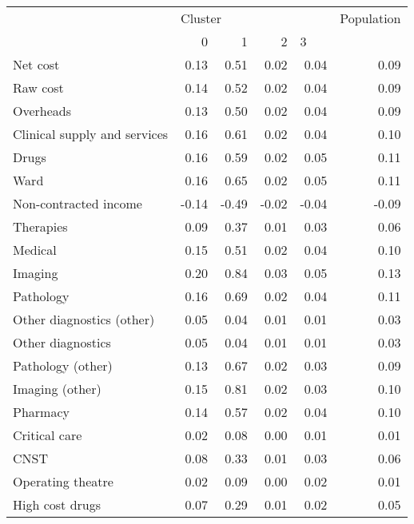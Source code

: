 \begin{tabular}{lrrrrr}
\toprule
{} & \multicolumn{4}{l}{Cluster} & Population \\
{} &       0 &     1 &     2 & \multicolumn{2}{l}{3} \\
\midrule
Net cost                       &    0.13 &  0.51 &  0.02 &  0.04 &       0.09 \\
Raw cost                       &    0.14 &  0.52 &  0.02 &  0.04 &       0.09 \\
Overheads                      &    0.13 &  0.50 &  0.02 &  0.04 &       0.09 \\
Clinical supply and services   &    0.16 &  0.61 &  0.02 &  0.04 &       0.10 \\
Drugs                          &    0.16 &  0.59 &  0.02 &  0.05 &       0.11 \\
Ward                           &    0.16 &  0.65 &  0.02 &  0.05 &       0.11 \\
Non-contracted income          &   -0.14 & -0.49 & -0.02 & -0.04 &      -0.09 \\
Therapies                      &    0.09 &  0.37 &  0.01 &  0.03 &       0.06 \\
Medical                        &    0.15 &  0.51 &  0.02 &  0.04 &       0.10 \\
Imaging                        &    0.20 &  0.84 &  0.03 &  0.05 &       0.13 \\
Pathology                      &    0.16 &  0.69 &  0.02 &  0.04 &       0.11 \\
Other diagnostics (other)      &    0.05 &  0.04 &  0.01 &  0.01 &       0.03 \\
Other diagnostics              &    0.05 &  0.04 &  0.01 &  0.01 &       0.03 \\
Pathology (other)              &    0.13 &  0.67 &  0.02 &  0.03 &       0.09 \\
Imaging (other)                &    0.15 &  0.81 &  0.02 &  0.03 &       0.10 \\
Pharmacy                       &    0.14 &  0.57 &  0.02 &  0.04 &       0.10 \\
Critical care                  &    0.02 &  0.08 &  0.00 &  0.01 &       0.01 \\
CNST                           &    0.08 &  0.33 &  0.01 &  0.03 &       0.06 \\
Operating theatre              &    0.02 &  0.09 &  0.00 &  0.02 &       0.01 \\
High cost drugs                &    0.07 &  0.29 &  0.01 &  0.02 &       0.05 \\

\end{tabular}
